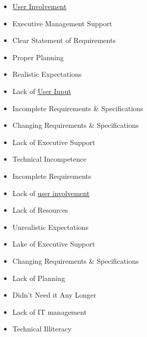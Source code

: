 \documentclass[landscape,30pt]{foils}
\begin{document}

\begin{itemize}
\item \underline{User Involvement}
\item Executive Management Support
\item Clear Statement of Requirements
\item Proper Planning
\item Realistic Expectations
\end{itemize}


\begin{itemize}
\item Lack of \underline{User Input}
\item Incomplete Requirements \& Specifications
\item Changing Requirements \& Specifications
\item Lack of Executive Support
\item Technical Incompetence
\end{itemize}


\begin{itemize}
\item Incomplete Requirements
\item Lack of \underline{user involvement}
\item Lack of Resources
\item Unrealistic Expectations
\item Lake of Executive Support
\item Changing Requirements \& Specifications
\item  Lack of Planning
\item  Didn't Need it Any Longer
\item Lack of IT management
\item Technical Illiteracy  
\end{itemize}

\end{document}
